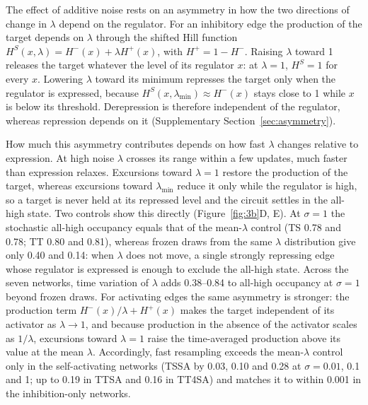 \documentclass[11pt]{article}
\begin{document}
The effect of additive noise rests on an asymmetry in how the two directions of change in $\lambda$ depend on the regulator. For an inhibitory edge the production of the target depends on $\lambda$ through the shifted Hill function $H^{S}(x,\lambda) = H^{-}(x) + \lambda H^{+}(x)$, with $H^{+} = 1 - H^{-}$. Raising $\lambda$ toward 1 releases the target whatever the level of its regulator $x$: at $\lambda = 1$, $H^{S} = 1$ for every $x$. Lowering $\lambda$ toward its minimum represses the target only when the regulator is expressed, because $H^{S}(x,\lambda_{\min}) \approx H^{-}(x)$ stays close to 1 while $x$ is below its threshold. Derepression is therefore independent of the regulator, whereas repression depends on it (Supplementary Section~\ref{sec:asymmetry}).

How much this asymmetry contributes depends on how fast $\lambda$ changes relative to expression. At high noise $\lambda$ crosses its range within a few updates, much faster than expression relaxes. Excursions toward $\lambda = 1$ restore the production of the target, whereas excursions toward $\lambda_{\min}$ reduce it only while the regulator is high, so a target is never held at its repressed level and the circuit settles in the all-high state. Two controls show this directly (Figure~\ref{fig:3b}D, E). At $\sigma = 1$ the stochastic all-high occupancy equals that of the mean-$\lambda$ control (TS 0.78 and 0.78; TT 0.80 and 0.81), whereas frozen draws from the same $\lambda$ distribution give only 0.40 and 0.14: when $\lambda$ does not move, a single strongly repressing edge whose regulator is expressed is enough to exclude the all-high state. Across the seven networks, time variation of $\lambda$ adds 0.38--0.84 to all-high occupancy at $\sigma = 1$ beyond frozen draws. For activating edges the same asymmetry is stronger: the production term $H^{-}(x)/\lambda + H^{+}(x)$ makes the target independent of its activator as $\lambda \to 1$, and because production in the absence of the activator scales as $1/\lambda$, excursions toward $\lambda = 1$ raise the time-averaged production above its value at the mean $\lambda$. Accordingly, fast resampling exceeds the mean-$\lambda$ control only in the self-activating networks (TSSA by 0.03, 0.10 and 0.28 at $\sigma = 0.01$, 0.1 and 1; up to 0.19 in TTSA and 0.16 in TT4SA) and matches it to within 0.001 in the inhibition-only networks.
\end{document}
